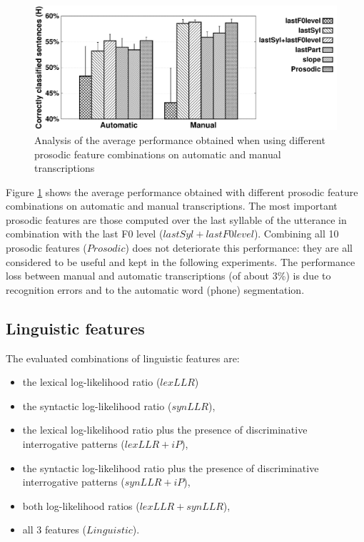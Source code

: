 \documentclass[runningheads,a4paper]{llncs}
\begin{document}
\begin{figure}
\begin{center}
\includegraphics[scale=0.45]{Image/averageStats_compareProsodicFeatures_withSD.pdf}
\end{center}
\caption{Analysis of the average performance obtained when using different prosodic feature combinations on automatic and manual transcriptions}
\label{Fig:P}
\end{figure}



Figure \ref{Fig:P} shows the average performance obtained with different prosodic feature combinations on automatic and manual transcriptions. %
The most important prosodic features are those computed over the last syllable of the utterance in combination with the last F0 level ($lastSyl+lastF0level$).
Combining all 10 prosodic features ($Prosodic$) does not deteriorate this performance: they are all considered to be useful and kept in the following experiments.
The performance loss between manual and automatic transcriptions (of about 3\%) is due to recognition errors and to the automatic word (phone) segmentation.



\subsection{Linguistic features}

The evaluated combinations of linguistic features are:
\begin{itemize}
\item the lexical log-likelihood ratio ($lexLLR$)
\item the syntactic log-likelihood ratio ($synLLR$),
\item the lexical log-likelihood ratio plus the presence of discriminative interrogative patterns ($lexLLR+iP$),
\item the syntactic log-likelihood ratio plus the presence of discriminative interrogative patterns ($synLLR+iP$),
\item both log-likelihood ratios ($lexLLR+synLLR$),
\item all 3 features ($Linguistic$).
\end{itemize}
\end{document}
